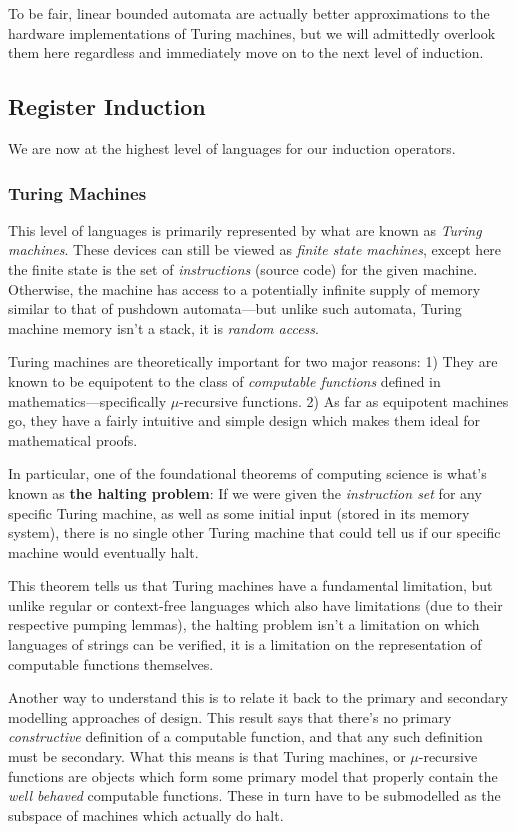 \documentclass[twoside]{article}
\newcommand{\strong}[1]{{\bfseries #1}}
\begin{document}
To be fair, linear bounded automata are actually better approximations to the hardware implementations of Turing machines,
but we will admittedly overlook them here regardless and immediately move on to the next level of induction.

\subsection*{Register Induction}

We are now at the highest level of languages for our induction operators.

\subsubsection*{Turing Machines}

This level of languages is primarily represented by what are known as \emph{Turing machines}. These devices can still
be viewed as \emph{finite state machines}, except here the finite state is the set of \emph{instructions} (source code)
for the given machine. Otherwise, the machine has access to a potentially infinite supply of memory similar to that of
pushdown automata---but unlike such automata, Turing machine memory isn't a stack, it is \emph{random access}.

Turing machines are theoretically important for two major reasons: 1) They are known to be equipotent to the class of
\emph{computable functions} defined in mathematics---specifically $ \mu $-recursive functions. 2) As far as
equipotent machines go, they have a fairly intuitive and simple design which makes them ideal for mathematical proofs.

In particular, one of the foundational theorems of computing science is what's known as \strong{the halting problem}:
If we were given the \emph{instruction set} for any specific Turing machine, as well as some initial input (stored in its
memory system), there is no single other Turing machine that could tell us if our specific machine would eventually halt.

This theorem tells us that Turing machines have a fundamental limitation, but unlike regular or context-free languages
which also have limitations (due to their respective pumping lemmas), the halting problem isn't a limitation on which
languages of strings can be verified, it is a limitation on the representation of computable functions themselves.

Another way to understand this is to relate it back to the primary and secondary modelling approaches of design.
This result says that there's no primary \emph{constructive} definition of a computable function, and that
any such definition must be secondary. What this means is that Turing machines, or $ \mu $-recursive functions
are objects which form some primary model that properly contain the \emph{well behaved} computable functions.
These in turn have to be submodelled as the subspace of machines which actually do halt.
\end{document}
